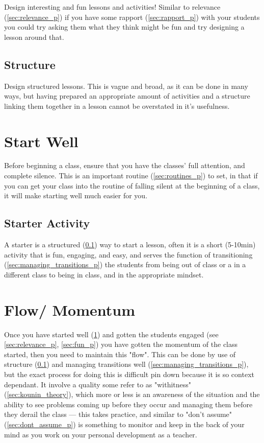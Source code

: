 \documentclass[12pt]{report}
\begin{document}
Design interesting and fun lessons and activities! Similar to relevance (\ref{sec:relevance_p}) if you have some rapport (\ref{sec:rapport_p}) with your students you could try asking them what they think might be fun and try designing a lesson around that.

\subsection{Structure}
\label{sec:structure_p}

Design structured lessons. This is vague and broad, as it can be done in many ways, but having prepared an appropriate amount of activities and a structure linking them together in a lesson cannot be overstated in it's usefulness.



\section{Start Well}
\label{sec:start_well_p}

Before beginning a class, ensure that you have the classes' full attention, and complete silence. This is an important routine (\ref{sec:routines_p}) to set, in that if you can get your class into the routine of falling silent at the beginning of a class, it will make starting well much easier for you.

\subsection{Starter Activity}
\label{sec:starter_acivity_p}

A starter is a structured (\ref{sec:structure_p}) way to start a lesson, often it is a short (5-10min) activity that is fun, engaging, and easy, and serves the function of transitioning (\ref{sec:managing_transitions_p}) the students from being out of class or a in a different class to being in class, and in the appropriate mindset.




\section{Flow/ Momentum}
\label{sec:flow_p}

Once you have started well (\ref{sec:start_well_p}) and gotten the students engaged (see \ref{sec:relevance_p}, \ref{sec:fun_p}) you have gotten the momentum of the class started, then you need to maintain this "flow". This can be done by use of structure (\ref{sec:structure_p}) and managing transitions well (\ref{sec:managing_transitions_p}), but the exact process for doing this is difficult pin down because it is so context dependant. It involve a quality some refer to as "withitness" (\ref{sec:kounin_theory}), which more or less is an awareness of the situation and the ability to see problems coming up before they occur and managing them before they derail the class --- this takes practice, and similar to "don't assume" (\ref{sec:dont_assume_p}) is something to monitor and keep in the back of your mind as you work on your personal development as a teacher.
\end{document}
